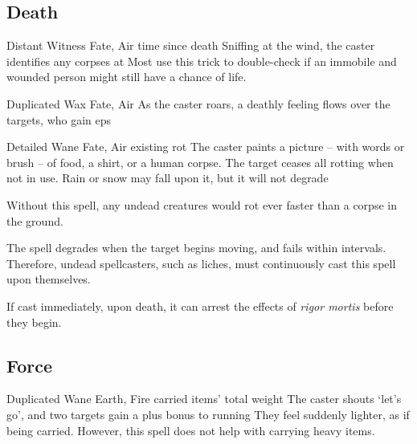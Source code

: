 \begin{multicols}{2}
\subsection{Death}


  {Distant}%
  {Witness}%
  {Fate, Air}%
  {time since death}%
  {Sniffing at the wind, the caster identifies any corpses at \spellRange}%
  {Most use this trick to double-check if an immobile and wounded person might still have a chance of life.}

  {Duplicated}%
  {Wax}%
  {Fate, Air}%
  {}%
  {As the caster roars, a deathly feeling flows over the targets, who gain  \glspl{ep}}%
  {}

  {Detailed}%
  {Wane}%
  {Fate, Air}%
  {existing rot}%
  {The caster paints a picture -- with words or brush -- of food, a shirt, or a human corpse.
  The target ceases all rotting when not in use.
  Rain or snow may fall upon it, but it will not degrade}%
  {
    Without this spell, any undead creatures would rot ever faster than a corpse in the ground.

    The spell degrades when the target begins moving, and fails within  \glspl{interval}.
    Therefore, undead spellcasters, such as liches, must continuously cast this spell upon themselves.

    If cast immediately, upon death, it can arrest the effects of \textit{rigor mortis} before they begin.
  }

\subsection{Force}


  {Duplicated}%
  {Wane}%
  {Earth, Fire}%
  {carried items' total \gls{weight}}%
  {The caster shouts `let's go', and two targets gain a plus  bonus to running}%
  {They feel suddenly lighter, as if being carried.
  However, this spell does not help with carrying heavy items.}


\end{multicols}
